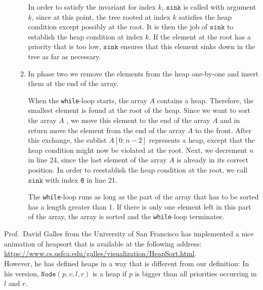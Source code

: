 \begin{enumerate}
\begin{enumerate}
            In order to satisfy the invariant for index ${k}$, $\texttt{sink}$ is called with
            argument ${k}$,  since at this point, the tree rooted at index ${k}$ satisfies
            the heap condition except possibly at the root.  It is then the job of $\texttt{sink}$ to
            establish the heap condition at index ${k}$.  If the element at the root has a
            priority that is too low, $\texttt{sink}$ ensures that this element sinks down in the tree
            as far as necessary.
      \item In phase two we remove the elements from the heap one-by-one and insert them at the end of
            the array.

            When the \texttt{while}-loop starts, the array ${A}$ contains a heap.  Therefore,
            the smallest element is found at the root of the heap.  Since we want to sort the
            array ${A}$ , we move this element to the end of the array ${A}$ and in
            return move the element from the end of the array ${A}$ to the front.
            After this exchange, the sublist $A[0:n-2]$ represents a heap, except that the
            heap condition might now be violated at the root.  Next, we decrement ${n}$ in line 24, since the
            last element of the array ${A}$ is already in its correct position.  
            In order to reestablish the heap condition at the root, we call $\texttt{sink}$ with index
            \texttt{0} in line 21.

            The \texttt{while}-loop runs as long as the part of the array that has to be sorted has
            a length greater than 1.  If there is only one element left in this part of the array, the array is
            sorted and the \texttt{while}-loop terminates.
      \end{enumerate}
\end{enumerate}
Prof.~David Galles from the University of San Francisco has implemented a nice animation of heapsort that is
available at the following address:
\\[0.2cm]
\hspace*{1.3cm}
\href{https://www.cs.usfca.edu/~galles/visualization/HeapSort.html}{https://www.cs.usfca.edu/galles/visualization/HeapSort.html}.
\\[0.2cm] 
However, he has defined heaps in a way that is different from our definition:  In his version,
$\texttt{Node}(p, v, l, r)$ is a heap if $p$ is bigger than all priorities occurring in $l$ and $r$.

